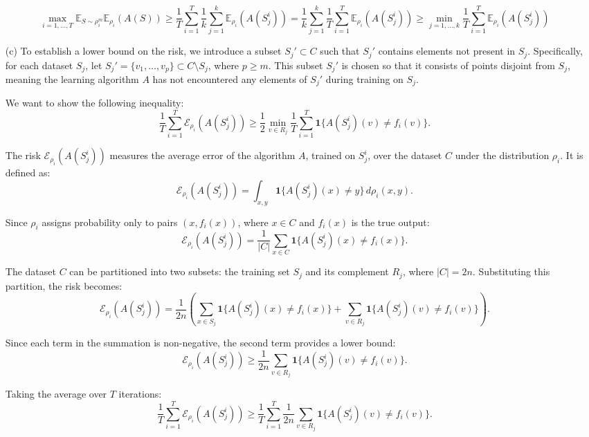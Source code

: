 \documentclass{article}
\begin{document}
\begin{itemize}
    \[
    \max_{i = 1, \dots, T} \mathbb{E}_{S \sim \rho_i^m} \mathbb{E}_{\rho_i}(A(S)) 
    \geq \frac{1}{T} \sum_{i=1}^T \frac{1}{k}\sum_{j=1}^k\mathbb{E}_{\rho_i}(A(S_j^i)) 
    = \frac{1}{k} \sum_{j=1}^k \frac{1}{T} \sum_{i=1}^T \mathbb{E}_{\rho_i}(A(S_j^i))  
    \geq \min_{j = 1, \dots, k} \frac{1}{T} \sum_{i=1}^T \mathbb{E}_{\rho_i}(A(S_j^i))
    \]
    
    \item[(c)] To establish a lower bound on the risk, we introduce a subset \( S_j' \subset C \) such that \( S_j' \) contains elements not present in \( S_j \). Specifically, for each dataset \( S_j \), let \( S_j' = \{v_1, \dots, v_p\} \subset C \setminus S_j \), where \( p \ge m \). This subset \( S_j' \) is chosen so that it consists of points disjoint from \( S_j \), meaning the learning algorithm \( A \) has not encountered any elements of \( S_j' \) during training on \( S_j \).

    We want to show the following inequality:
    \[
    \frac{1}{T} \sum_{i=1}^T \mathcal{E}_{\rho_i}(A(S_j^i)) \geq \frac{1}{2} \min_{v \in R_j} \frac{1}{T} \sum_{i=1}^T \mathbf{1}\{A(S_j^i)(v) \neq f_i(v)\}.
    \]
        
    The risk \( \mathcal{E}_{\rho_i}(A(S_j^i)) \) measures the average error of the algorithm \( A \), trained on \( S_j^i \), over the dataset \( C \) under the distribution \( \rho_i \). It is defined as:
    \[
    \mathcal{E}_{\rho_i}(A(S_j^i)) = \int_{x, y} \mathbf{1}\{A(S_j^i)(x) \neq y\} \, d\rho_i(x, y).
    \]
    
    Since \( \rho_i \) assigns probability only to pairs \( (x, f_i(x)) \), where \( x \in C \) and \( f_i(x) \) is the true output:
    \[
    \mathcal{E}_{\rho_i}(A(S_j^i)) = \frac{1}{|C|} \sum_{x \in C} \mathbf{1}\{A(S_j^i)(x) \neq f_i(x)\}.
    \]
    
    The dataset \( C \) can be partitioned into two subsets: the training set \( S_j \) and its complement \( R_j \), where \( |C| = 2n \). Substituting this partition, the risk becomes:
    \[
    \mathcal{E}_{\rho_i}(A(S_j^i)) = \frac{1}{2n} \left( \sum_{x \in S_j} \mathbf{1}\{A(S_j^i)(x) \neq f_i(x)\} + \sum_{v \in R_j} \mathbf{1}\{A(S_j^i)(v) \neq f_i(v)\} \right).
    \]
    
    Since each term in the summation is non-negative, the second term provides a lower bound:
    \[
    \mathcal{E}_{\rho_i}(A(S_j^i)) \geq \frac{1}{2n} \sum_{v \in R_j} \mathbf{1}\{A(S_j^i)(v) \neq f_i(v)\}.
    \]
    
    Taking the average over \( T \) iterations:
    \[
    \frac{1}{T} \sum_{i=1}^T \mathcal{E}_{\rho_i}(A(S_j^i)) \geq \frac{1}{T} \sum_{i=1}^T \frac{1}{2n} \sum_{v \in R_j} \mathbf{1}\{A(S_j^i)(v) \neq f_i(v)\}.
    \]
    

\end{itemize}
\end{document}
